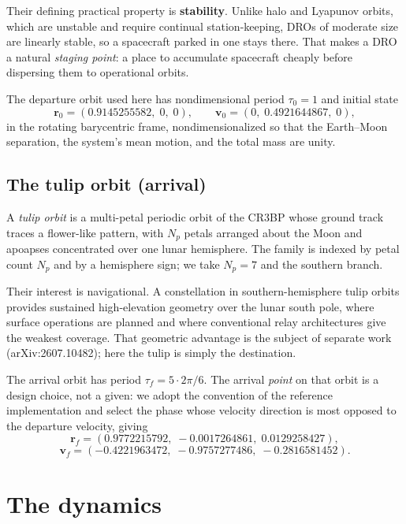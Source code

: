 \documentclass[11pt]{article}
\newcommand{\vecr}{\mathbf{r}}
\newcommand{\vecv}{\mathbf{v}}
\begin{document}
Their defining practical property is \textbf{stability}. Unlike halo and
Lyapunov orbits, which are unstable and require continual station-keeping, DROs
of moderate size are linearly stable, so a spacecraft parked in one stays there.
That makes a DRO a natural \emph{staging point}: a place to accumulate
spacecraft cheaply before dispersing them to operational orbits.

The departure orbit used here has nondimensional period $\tau_0 = 1$ and initial
state
\[
  \vecr_0 = (0.9145255582,\; 0,\; 0), \qquad
  \vecv_0 = (0,\; 0.4921644867,\; 0),
\]
in the rotating barycentric frame, nondimensionalized so that the Earth--Moon
separation, the system's mean motion, and the total mass are unity.

\subsection{The tulip orbit (arrival)}

A \emph{tulip orbit} is a multi-petal periodic orbit of the CR3BP whose ground
track traces a flower-like pattern, with $N_p$ petals arranged about the Moon
and apoapses concentrated over one lunar hemisphere. The family is indexed by
petal count $N_p$ and by a hemisphere sign; we take $N_p = 7$ and the southern
branch.

Their interest is navigational. A constellation in southern-hemisphere tulip
orbits provides sustained high-elevation geometry over the lunar south pole,
where surface operations are planned and where conventional relay architectures
give the weakest coverage. That geometric advantage is the subject of separate
work (arXiv:2607.10482); here the tulip is simply the destination.

The arrival orbit has period $\tau_f = 5 \cdot 2\pi/6$. The arrival
\emph{point} on that orbit is a design choice, not a given: we adopt the
convention of the reference implementation and select the phase whose velocity
direction is most opposed to the departure velocity, giving
\[
  \vecr_f = (0.9772215792,\; -0.0017264861,\; 0.0129258427),
\]
\[
  \vecv_f = (-0.4221963472,\; -0.9757277486,\; -0.2816581452).
\]

\section{The dynamics}
\end{document}
